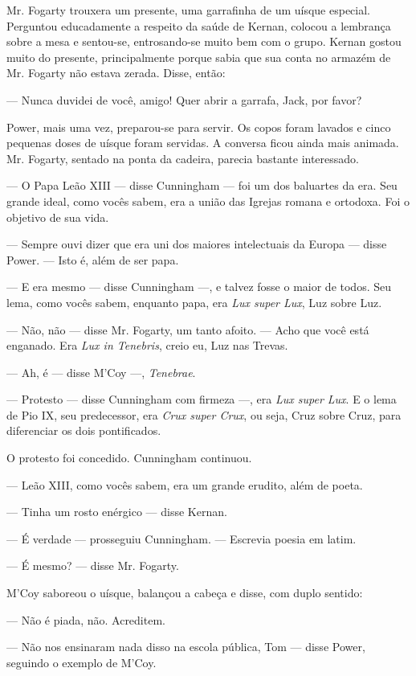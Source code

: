 Mr. Fogarty trouxera um presente, uma garrafinha de um uísque
especial. Perguntou educadamente a respeito da saúde de Kernan,
colocou a lembrança sobre a mesa e sentou-se, entrosando-se muito
bem com o grupo. Kernan gostou muito do presente, principalmente
porque sabia que sua conta no armazém de Mr. Fogarty não estava
zerada. Disse, então:

--- Nunca duvidei de você, amigo! Quer abrir a garrafa, Jack, por
favor?

Power, mais uma vez, preparou-se para servir. Os copos foram lavados e
cinco pequenas doses de uísque foram servidas. A conversa ficou ainda
mais animada. Mr. Fogarty, sentado na ponta da cadeira, parecia
bastante interessado.

--- O Papa Leão XIII --- disse Cunningham --- foi um dos baluartes da
era. Seu grande ideal, como vocês sabem, era a união das Igrejas
romana e ortodoxa. Foi o objetivo de sua vida.

--- Sempre ouvi dizer que era uni dos maiores intelectuais da Europa
--- disse Power. --- Isto é, além de ser papa.

--- E era mesmo --- disse Cunningham ---, e talvez fosse o maior de
todos. Seu lema, como vocês sabem, enquanto papa, era \textit{Lux super Lux},
Luz sobre Luz.

--- Não, não --- disse Mr. Fogarty, um tanto afoito. --- Acho que você
está enganado. Era \textit{Lux in Tenebris}, creio eu, Luz nas Trevas.

--- Ah, é --- disse M'Coy ---, \textit{Tenebrae}.

--- Protesto --- disse Cunningham com firmeza ---, era \textit{Lux super Lux}. E
o lema de Pio IX, seu predecessor, era \textit{Crux super Crux}, ou seja, Cruz
sobre Cruz, para diferenciar os dois pontificados.

O protesto foi concedido. Cunningham continuou.

--- Leão XIII, como vocês sabem, era um grande erudito, além de
poeta.

--- Tinha um rosto enérgico --- disse Kernan.

--- É verdade --- prosseguiu Cunningham. --- Escrevia poesia em latim.

--- É mesmo? --- disse Mr. Fogarty.

M'Coy saboreou o uísque, balançou a cabeça e disse, com duplo sentido:

--- Não é piada, não. Acreditem.

--- Não nos ensinaram nada disso na escola pública, Tom --- disse
Power, seguindo o exemplo de M'Coy.

